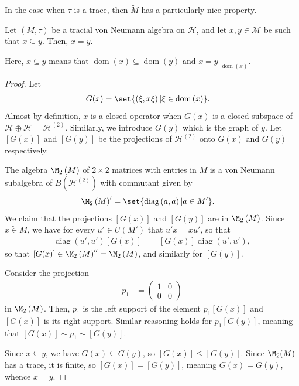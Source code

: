\documentclass[10pt]{mypackage}
\begin{document}
In the case when $\tau$ is a trace, then $ \widetilde{M} $ has a particularly nice property.
\begin{proposition}
  Let $\left( M,\tau \right)$ be a tracial von Neumann algebra on $\mathcal{H}$, and let $x,y\in \mathcal{M}$ be such that $x\subseteq y$. Then, $x = y$.
\end{proposition}
Here, $x\subseteq y$ means that $\operatorname{dom}\left( x \right)\subseteq \operatorname{dom}\left( y \right)$ and $x = y|_{\operatorname{dom}\left( x \right)}$.
\begin{proof}
  Let
  \begin{align*}
    G(x) &= \set{\left( \xi,x\xi \right) | \xi\in \operatorname{dom}\left( x \right)}.
  \end{align*}
  Almost by definition, $x$ is a closed operator when $G(x)$ is a closed subspace of $\mathcal{H}\oplus \mathcal{H} = \mathcal{H}^{(2)}$. Similarly, we introduce $G(y)$ which is the graph of $y$. Let $\left[ G(x) \right]$ and $\left[ G(y) \right]$ be the projections of $\mathcal{H}^{(2)}$ onto $G(x)$ and $G(y)$ respectively.

  The algebra $\M_2\left( M \right)$ of $2\times 2$ matrices with entries in $M$ is a von Neumann subalgebra of $B\left( \mathcal{H}^{(2)} \right)$ with commutant given by
  \begin{align*}
    \M_2\left( M \right)' &= \set{ \operatorname{diag}\left( a,a \right) | a\in M' }.
  \end{align*}
  We claim that the projections $\left[ G(x) \right]$ and $\left[ G(y) \right]$ are in $\M_2\left( M \right)$. Since $ x \widetilde{\in} M $, we have for every $u'\in U\left( M' \right)$ that $u'x = xu'$, so that
  \begin{align*}
    \operatorname{diag}\left( u',u' \right) \left[ G(x) \right] &= \left[ G(x) \right] \operatorname{diag}\left( u',u' \right),
  \end{align*}
  so that $\left[ G(x) \right]\in \M_2\left( M \right)'' = \M_2\left( M \right)$, and similarly for $\left[ G(y) \right]$.

  Consider the projection
  \begin{align*}
    p_1 &= \begin{pmatrix}1 & 0 \\ 0 & 0\end{pmatrix}
  \end{align*}
  in $\M_2\left( M \right)$. Then, $p_1$ is the left support of the element $p_1\left[ G(x) \right]$ and $\left[ G(x) \right]$ is its right support. Similar reasoning holds for $p_1\left[ G(y) \right]$, meaning that $\left[ G(x) \right]\sim p_1\sim \left[ G(y) \right]$.

  Since $x\subseteq y$, we have $G(x)\subseteq G(y)$, so $\left[ G(x) \right]\leq \left[ G(y) \right]$. Since $\M_2(M)$ has a trace, it is finite, so $\left[ G(x) \right] = \left[ G(y) \right]$, meaning $G(x) = G(y)$, whence $x = y$.
\end{proof}
\end{document}
